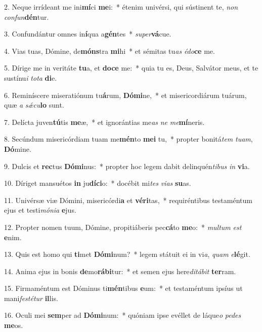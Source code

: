 2. Neque irrídeant me ini\textbf{mí}ci \textbf{me}i:~*  étenim univérsi, qui sústinent te, \textit{non} \textit{con}\textit{fun}\textbf{dén}tur.\

3. Confundántur omnes in\textbf{í}qua a\textbf{gén}tes~*  \textit{su}\textit{per}\textbf{vá}cue.\

4. Vias tuas, Dómine, de\textbf{móns}tra \textbf{mi}hi~*  et sémitas tu\textit{as} \textit{é}\textit{do}\textbf{ce} me.\

5. Dírige me in veritáte \textbf{tu}a, et \textbf{do}\textbf{ce} me:~*  quia tu es, Deus, Salvátor meus, et te sustínu\textit{i} \textit{to}\textit{ta} \textbf{di}e.\

6. Reminíscere miseratiónum tu\textbf{á}rum, \textbf{Dó}\textbf{mi}ne,~*  et misericordiárum tuárum, quæ \textit{a} \textit{sǽ}\textit{cu}\textbf{lo} sunt.\

7. Delícta juven\textbf{tú}tis \textbf{me}æ,~*  et ignorántias me\textit{as} \textit{ne} \textit{me}\textbf{mí}neris.\

8. Secúndum misericórdiam tuam me\textbf{mén}to \textbf{me}\textbf{i} tu,~*  propter bonitá\textit{tem} \textit{tu}\textit{am}, \textbf{Dó}mine.\

9. Dulcis et \textbf{rec}tus \textbf{Dó}\textbf{mi}nus:~*  propter hoc legem dabit delinquén\textit{ti}\textit{bus} \textit{in} \textbf{vi}a.\

10. Díriget mansuétos \textbf{in} ju\textbf{dí}\textbf{ci}o:~*  docébit mi\textit{tes} \textit{vi}\textit{as} \textbf{su}as.\

11. Univérsæ viæ Dómini, misericórdi\textbf{a} et \textbf{vé}\textbf{ri}tas,~*  requiréntibus testaméntum ejus et testi\textit{mó}\textit{ni}\textit{a} \textbf{e}jus.\

12. Propter nomen tuum, Dómine, propitiáberis pec\textbf{cá}to \textbf{me}o:~*  \textit{mul}\textit{tum} \textit{est} \textbf{e}nim.\

13. Quis est homo qui \textbf{ti}met \textbf{Dó}\textbf{mi}num?~*  legem státuit ei in vi\textit{a}, \textit{quam} \textit{e}\textbf{lé}git.\

14. Anima ejus in bonis \textbf{de}mo\textbf{rá}\textbf{bi}tur:~*  et semen ejus here\textit{di}\textit{tá}\textit{bit} \textbf{ter}ram.\

15. Firmaméntum est Dóminus ti\textbf{mén}tibus \textbf{e}um:~*  et testaméntum ipsíus ut mani\textit{fes}\textit{té}\textit{tur} \textbf{il}lis.\

16. Oculi mei \textbf{sem}per ad \textbf{Dó}\textbf{mi}num:~*  quóniam ipse evéllet de láque\textit{o} \textit{pe}\textit{des} \textbf{me}os.\

